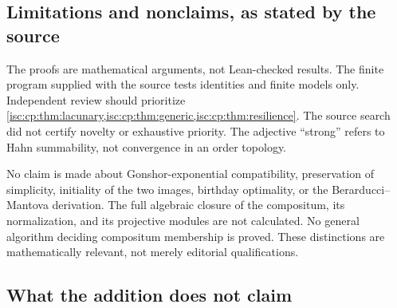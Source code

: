 \documentclass[11pt,letterpaper]{article}
\theoremstyle{definition}
\theoremstyle{remark}
\numberwithin{equation}{section}
\begin{document}
\subsection{Limitations and nonclaims, as stated by the source}

The proofs are mathematical arguments, not Lean-checked results. The finite
program supplied with the source tests identities and finite models only.
Independent review should prioritize
\cref{isc:cp:thm:lacunary,isc:cp:thm:generic,isc:cp:thm:resilience}. The
source search did not certify novelty or exhaustive priority. The adjective
``strong'' refers to Hahn summability, not convergence in an order topology.

No claim is made about Gonshor-exponential compatibility, preservation of
simplicity, initiality of the two images, birthday optimality, or the
Berarducci--Mantova derivation. The full algebraic closure of the
compositum, its normalization, and its projective modules are not
calculated. No general algorithm deciding compositum membership is proved.
These distinctions are mathematically relevant, not merely editorial
qualifications.

\subsection{What the addition does not claim}\label{isc:cp:sub:nonclaims}
\end{document}

